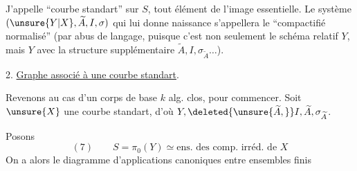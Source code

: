J'appelle ``courbe  standart'' sur $S$, tout élément de l'image essentielle. Le système $(\unsure{Y|X},\widetilde A,I,\sigma)$ qui lui donne naissance s'appellera le ``compactifié normalisé''  (par abus de  langage, puisque c'est non seulement le schéma relatif $Y$, mais $Y$ avec la structure supplémentaire $\widetilde A,I,\sigma_{\widetilde A}\ldots$).

2. \uline{Graphe associé à une courbe standart}.

Revenons au cas d'un corps de base $k$ alg. clos, pour commencer. Soit $\unsure{X}$ une courbe standart, d'où $Y,\deleted{\unsure{\widetilde A,}}I,\widetilde A,\sigma_{\widetilde A}$.

Posons
\[
(7)\qquad S=\pi_0(Y)\simeq\text{ens. des comp. irréd. de }X
\]
On a alors le diagramme d'applications canoniques entre ensembles finis
